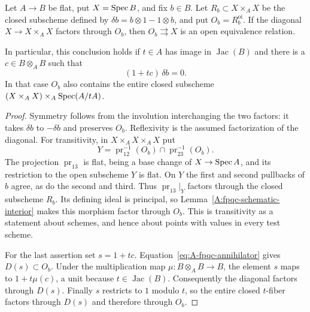 \begin{proposition}
\label{A:fpqc-open-relation}
Let $A\to B$ be flat, put $X=\operatorname{Spec} B$, and fix $b\in B$.
Let $R_b\subset X\times_A X$ be the closed subscheme defined by
$\delta b=b\otimes1-1\otimes b$, and put $O_b=R_b^{\mathrm{oi}}$.
If the diagonal $X\to X\times_A X$ factors through $O_b$, then
$O_b\rightrightarrows X$ is an open equivalence relation.

In particular, this conclusion holds if $t\in A$ has image in
$\operatorname{Jac}(B)$ and there is a $c\in B\otimes_A B$ such that
\[
                 (1+tc)\,\delta b=0.                         \tag{A.f1}\label{eq:A-fpqc-annihilator}
\]
In that case $O_b$ also contains the entire closed subscheme
$(X\times_A X)\times_A\operatorname{Spec}(A/tA)$.
\end{proposition}
\begin{proof}
Symmetry follows from the involution interchanging the two factors:
it takes $\delta b$ to $-\delta b$ and preserves $O_b$.
Reflexivity is the assumed factorization of the diagonal.
For transitivity, in $X\times_A X\times_A X$ put
\[
          Y=\operatorname{pr}_{12}^{-1}(O_b)
             \cap\operatorname{pr}_{23}^{-1}(O_b).
\]
The projection $\operatorname{pr}_{13}$ is flat, being a base change
of $X\to\operatorname{Spec} A$, and its restriction to the open subscheme $Y$
is flat.  On $Y$ the first and second pullbacks of $b$ agree, as do
the second and third.  Thus $\operatorname{pr}_{13}|_Y$ factors
through the closed subscheme $R_b$.  Its defining ideal is principal,
so Lemma~\ref{A:fpqc-schematic-interior} makes this morphism factor
through $O_b$.  This is transitivity as a statement about schemes,
and hence about points with values in every test scheme.

For the last assertion set $s=1+tc$.  Equation~\eqref{eq:A-fpqc-annihilator} gives
$D(s)\subset O_b$.  Under the multiplication map
$\mu:B\otimes_A B\to B$, the element $s$ maps to
$1+t\mu(c)$, a unit because $t\in\operatorname{Jac}(B)$.
Consequently the diagonal factors through $D(s)$.
Finally $s$ restricts to $1$ modulo $t$, so the entire closed
$t$-fiber factors through $D(s)$ and therefore through $O_b$.
\end{proof}

